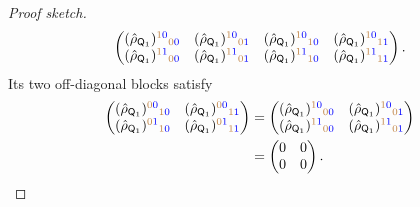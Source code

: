 \documentclass[
    aps,
    pra,
    reprint,
    superscriptaddress,
    nofootinbib
]{revtex4-2}
\theoremstyle{definition}
\theoremstyle{plain}
\begin{document}
\begin{proof}[Proof sketch]
\begin{equation}
\begin{pmatrix}
        (\hat{\rho}_{\mathsf{Q}_{1}})^{\color{brown}1\color{blue}0}{}_{\color{brown}0\color{blue}0}&
        (\hat{\rho}_{\mathsf{Q}_{1}})^{\color{brown}1\color{blue}0}{}_{\color{brown}0\color{blue}1}&
        (\hat{\rho}_{\mathsf{Q}_{1}})^{\color{brown}1\color{blue}0}{}_{\color{brown}1\color{blue}0}&
        (\hat{\rho}_{\mathsf{Q}_{1}})^{\color{brown}1\color{blue}0}{}_{\color{brown}1\color{blue}1}\\
        (\hat{\rho}_{\mathsf{Q}_{1}})^{\color{brown}1\color{blue}1}{}_{\color{brown}0\color{blue}0}&
        (\hat{\rho}_{\mathsf{Q}_{1}})^{\color{brown}1\color{blue}1}{}_{\color{brown}0\color{blue}1}&
        (\hat{\rho}_{\mathsf{Q}_{1}})^{\color{brown}1\color{blue}1}{}_{\color{brown}1\color{blue}0}&
        (\hat{\rho}_{\mathsf{Q}_{1}})^{\color{brown}1\color{blue}1}{}_{\color{brown}1\color{blue}1}
        \end{pmatrix}.
        \end{equation}
        Its two off-diagonal blocks satisfy
        \begin{equation}
        \begin{aligned}
        \begin{pmatrix}
        (\hat{\rho}_{\mathsf{Q}_{1}})^{\color{brown}0\color{blue}0}{}_{\color{brown}1\color{blue}0}&
        (\hat{\rho}_{\mathsf{Q}_{1}})^{\color{brown}0\color{blue}0}{}_{\color{brown}1\color{blue}1}\\
        (\hat{\rho}_{\mathsf{Q}_{1}})^{\color{brown}0\color{blue}1}{}_{\color{brown}1\color{blue}0}&
        (\hat{\rho}_{\mathsf{Q}_{1}})^{\color{brown}0\color{blue}1}{}_{\color{brown}1\color{blue}1}
        \end{pmatrix}
        &=
        \begin{pmatrix}
        (\hat{\rho}_{\mathsf{Q}_{1}})^{\color{brown}1\color{blue}0}{}_{\color{brown}0\color{blue}0}&
        (\hat{\rho}_{\mathsf{Q}_{1}})^{\color{brown}1\color{blue}0}{}_{\color{brown}0\color{blue}1}\\
        (\hat{\rho}_{\mathsf{Q}_{1}})^{\color{brown}1\color{blue}1}{}_{\color{brown}0\color{blue}0}&
        (\hat{\rho}_{\mathsf{Q}_{1}})^{\color{brown}1\color{blue}1}{}_{\color{brown}0\color{blue}1}
        \end{pmatrix}\\
        &=
        \begin{pmatrix}
            0&0\\
            0&0
        \end{pmatrix}.
        \end{aligned}

\end{equation}
\end{proof}
\end{document}
